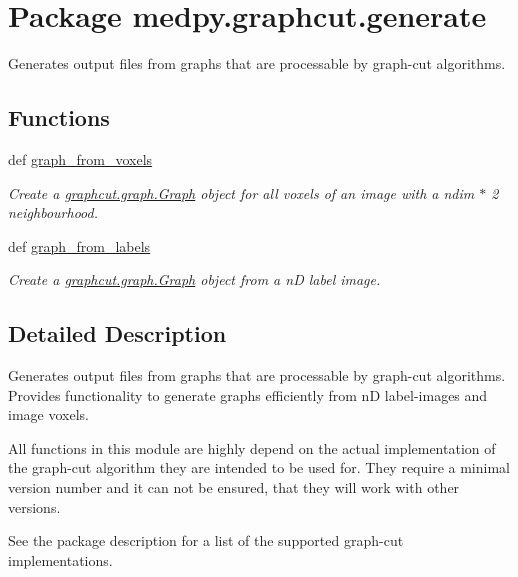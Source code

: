 \hypertarget{namespacemedpy_1_1graphcut_1_1generate}{
\section{Package medpy.graphcut.generate}
\label{namespacemedpy_1_1graphcut_1_1generate}
}


Generates output files from graphs that are processable by graph-\/cut algorithms.  


\subsection*{Functions}
\begin{DoxyCompactItemize}
\item 
def \hyperlink{namespacemedpy_1_1graphcut_1_1generate_a5533013ae970ceb90ca67cf4e6f1da41}{graph\_\-from\_\-voxels}
\begin{DoxyCompactList}\small\item\em Create a \hyperlink{classmedpy_1_1graphcut_1_1graph_1_1Graph}{graphcut.graph.Graph} object for all voxels of an image with a ndim $\ast$ 2 neighbourhood. \end{DoxyCompactList}\item 
def \hyperlink{namespacemedpy_1_1graphcut_1_1generate_a137ecdeeb31eb5be7bdcf70da1509477}{graph\_\-from\_\-labels}
\begin{DoxyCompactList}\small\item\em Create a \hyperlink{classmedpy_1_1graphcut_1_1graph_1_1Graph}{graphcut.graph.Graph} object from a nD label image. \end{DoxyCompactList}\end{DoxyCompactItemize}


\subsection{Detailed Description}
Generates output files from graphs that are processable by graph-\/cut algorithms. Provides functionality to generate graphs efficiently from nD label-\/images and image voxels.

All functions in this module are highly depend on the actual implementation of the graph-\/cut algorithm they are intended to be used for. They require a minimal version number and it can not be ensured, that they will work with other versions.

See the package description for a list of the supported graph-\/cut implementations.

